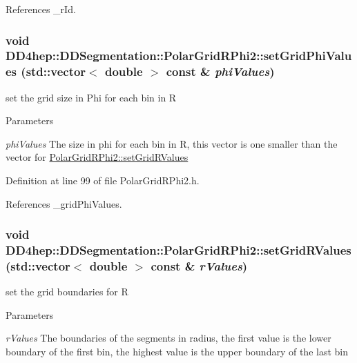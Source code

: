 References \_\-rId.\hypertarget{class_d_d4hep_1_1_d_d_segmentation_1_1_polar_grid_r_phi2_a738e77165e575ee463fab4e5daec543b}{
\subsubsection[{setGridPhiValues}]{\setlength{\rightskip}{0pt plus 5cm}void DD4hep::DDSegmentation::PolarGridRPhi2::setGridPhiValues (std::vector$<$ double $>$ const \& {\em phiValues})}}
\label{class_d_d4hep_1_1_d_d_segmentation_1_1_polar_grid_r_phi2_a738e77165e575ee463fab4e5daec543b}
set the grid size in Phi for each bin in R 
\begin{DoxyParams}{Parameters}
\item[{\em phiValues}]The size in phi for each bin in R, this vector is one smaller than the vector for \hyperlink{class_d_d4hep_1_1_d_d_segmentation_1_1_polar_grid_r_phi2_a2194e846c26953f06cc74481d8aadeb4}{PolarGridRPhi2::setGridRValues} \end{DoxyParams}


Definition at line 99 of file PolarGridRPhi2.h.

References \_\-gridPhiValues.\hypertarget{class_d_d4hep_1_1_d_d_segmentation_1_1_polar_grid_r_phi2_a6d8ed0487267fd1b67bc0d76b2f41b3a}{
\subsubsection[{setGridRValues}]{\setlength{\rightskip}{0pt plus 5cm}void DD4hep::DDSegmentation::PolarGridRPhi2::setGridRValues (std::vector$<$ double $>$ const \& {\em rValues})}}
\label{class_d_d4hep_1_1_d_d_segmentation_1_1_polar_grid_r_phi2_a6d8ed0487267fd1b67bc0d76b2f41b3a}
set the grid boundaries for R 
\begin{DoxyParams}{Parameters}
\item[{\em rValues}]The boundaries of the segments in radius, the first value is the lower boundary of the first bin, the highest value is the upper boundary of the last bin \end{DoxyParams}


